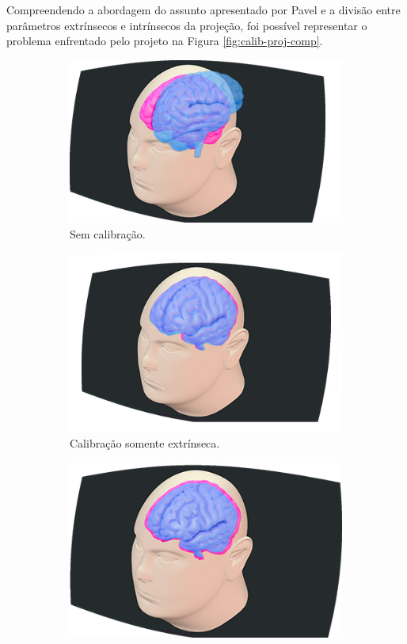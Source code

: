 Compreendendo a abordagem do assunto apresentado por Pavel e a divisão entre parâmetros extrínsecos e intrínsecos da projeção, foi possível representar o problema enfrentado pelo projeto na Figura \ref{fig:calib-proj-comp}.

\begin{figure}[H]
    \centering
    \begin{subfigure}{.4\textwidth}
        \centering
        \includegraphics[width=.65\textwidth]{figuras/CalibNot2.png}
        \caption{Sem calibração.}
        \label{fig:calib-proj-without}
    \end{subfigure}
    \begin{subfigure}{.4\textwidth}
        \centering
        \includegraphics[width=.65\textwidth]{figuras/CalibExtr.png}
        \caption{Calibração somente extrínseca.}
        \label{fig:calib-proj-extr}
    \end{subfigure}
    \begin{subfigure}{.4\textwidth}
        \centering
        \includegraphics[width=.65\textwidth]{figuras/CalibIntr.png}

\end{subfigure}
\end{figure}
